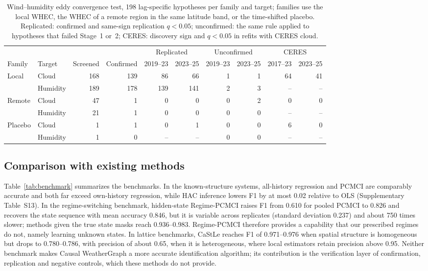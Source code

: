 \documentclass[preprint,12pt]{elsarticle}
\begin{document}
\begin{table}[htbp]
\centering
\caption{Wind--humidity eddy convergence test, 198 lag-specific hypotheses per family and target; families use the local WHEC, the WHEC of a remote region in the same latitude band, or the time-shifted placebo. Replicated: confirmed and same-sign replication $q<0.05$; unconfirmed: the same rule applied to hypotheses that failed Stage~1 or~2; CERES: discovery sign and $q<0.05$ in refits with CERES cloud.}
\label{tab:whec}
\scriptsize
\setlength{\tabcolsep}{3.5pt}
\begin{tabular}{@{}llrrrrrrrr@{}}
\toprule
& & & & \multicolumn{2}{c}{Replicated} & \multicolumn{2}{c}{Unconfirmed} & \multicolumn{2}{c}{CERES} \\
\cmidrule(lr){5-6}\cmidrule(lr){7-8}\cmidrule(lr){9-10}
Family & Target & Screened & Confirmed & 2019--23 & 2023--25 & 2019--23 & 2023--25 & 2017--23 & 2023--25 \\
\midrule
Local & Cloud & 168 & 139 & 86 & 66 & 1 & 1 & 64 & 41 \\
 & Humidity & 189 & 178 & 139 & 141 & 2 & 3 & -- & -- \\
Remote & Cloud & 47 & 1 & 0 & 0 & 0 & 2 & 0 & 0 \\
 & Humidity & 21 & 1 & 0 & 0 & 0 & 0 & -- & -- \\
Placebo & Cloud & 1 & 1 & 0 & 1 & 0 & 0 & 6 & 0 \\
 & Humidity & 1 & 0 & -- & -- & 0 & 0 & -- & -- \\
\bottomrule
\end{tabular}
\end{table}

\subsection{Comparison with existing methods}
\label{subsec:bench_res}

Table~\ref{tab:benchmark} summarizes the benchmarks. In the known-structure systems, all-history regression and PCMCI are comparably accurate and both far exceed own-history regression, while HAC inference lowers F1 by at most 0.02 relative to OLS (Supplementary Table~S13). In the regime-switching benchmark, hidden-state Regime-PCMCI raises F1 from 0.610 for pooled PCMCI to 0.826 and recovers the state sequence with mean accuracy 0.846, but it is variable across replicates (standard deviation 0.237) and about 750 times slower; methods given the true state masks reach 0.936--0.983. Regime-PCMCI therefore provides a capability that our prescribed regimes do not, namely learning unknown states. In lattice benchmarks, CaStLe reaches F1 of 0.971--0.976 when spatial structure is homogeneous but drops to 0.780--0.786, with precision of about 0.65, when it is heterogeneous, where local estimators retain precision above 0.95. Neither benchmark makes Causal WeatherGraph a more accurate identification algorithm; its contribution is the verification layer of confirmation, replication and negative controls, which these methods do not provide.
\end{document}
